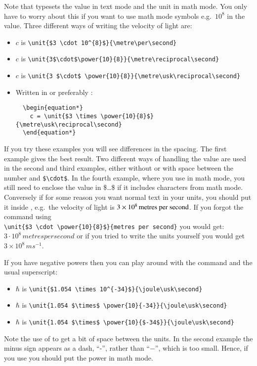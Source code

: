 Note that  typesets the value in text mode and the
unit in math mode. You only have to worry about this if you want to
use math mode symbols e.g.\ $10^{8}$ in the value. Three different ways
of writing the velocity of light are:
\begin{itemize}\setlength{\itemsep}{0pt}\setlength{\parskip}{0pt}
\item $c$ is \verb+\unit{$3 \cdot 10^{8}$}{\metre\per\second}+
\item $c$ is
  \verb+\unit{3$\cdot$\power{10}{8}}{\metre\reciprocal\second}+
\item $c$ is \verb+\unit{3 $\cdot$ \power{10}{8}}{\metre\usk\reciprocal\second}+
\item Written in  or preferably :
\begin{verbatim}
  \begin{equation*}
    c = \unit{$3 \times \power{10}{8}$}{\metre\usk\reciprocal\second}
  \end{equation*}
\end{verbatim}
\end{itemize}
If you try these examples you will see differences in the spacing.
The first example gives the best result.
Two different ways of handling the value
are used in the second and third examples, either without or with space between
the number and \verb+$\cdot$+. In the fourth example, where you use
 in math mode, you still need to enclose the value in
\$\ldots\$ if it includes characters from math mode.  Conversely if for
some reason you want normal text in your units, you should put it
inside , e.g.\ the velocity of light is
$\SI{3E8}{\text{metres per second}}$. If you forgot the
 command using\\
\verb+\unit{$3 \cdot \power{10}{8}$}{metres per second}+ you would
get:
$3 \cdot 10^{8}\,metres per second$ or if you tried to write the units
yourself you would get $3 \times 10^8\,m s^{-1}$.

If you have negative powers then you can play around with
the  command and the usual superscript:
\begin{itemize}
\item $\hbar$ is \verb+\unit{$1.054 \times 10^{-34}$}{\joule\usk\second}+
\item $\hbar$ is \verb+\unit{1.054 $\times$ \power{10}{-34}}{\joule\usk\second}+
\item $\hbar$ is \verb+\unit{1.054 $\times$ \power{10}{$-34$}}{\joule\usk\second}+
\end{itemize}
Note the use of  to get a bit of space between the
units. In the second example the minus sign appears as a dash,
\enquote{-}, rather than \enquote{$-$}, which is too small. Hence, if you
use  you should put the power in math mode.

